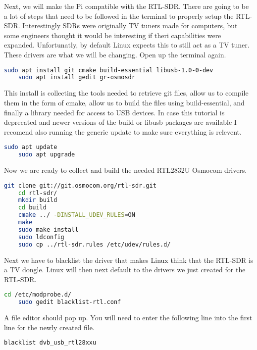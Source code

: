 \documentclass[letterpaper,12pt,notitlepage]{report} %
\begin{document}
Next, we will make the Pi compatible with the RTL-SDR. There are going to be a lot of steps that need to be followed in the terminal to properly setup the RTL-SDR. Interestingly SDRs were originally TV tuners made for computers, but some engineers thought it would be interesting if theri capabilities were expanded. Unfortunatly, by default Linux expects this to still act as a TV tuner. These drivers are what we will be changing. Open up the terminal again.

\begin{lstlisting}[language=bash]
	sudo apt install git cmake build-essential libusb-1.0-0-dev 
	sudo apt install gedit gr-osmosdr
\end{lstlisting}

This install is collecting the tools needed to retrieve git files, allow us to compile them in the form of cmake, allow us to build the files using build-essential, and finally a library needed for access to USB devices. In case this tutorial is deprecated and newer versions of the build or libusb packages are available I recomend also running the generic update to make sure everything is relevent.

\begin{lstlisting}[language=bash]
	sudo apt update
	sudo apt upgrade
\end{lstlisting}

Now we are ready to collect and build the needed RTL2832U Osmocom drivers.

\begin{lstlisting}[language=bash]
	git clone git://git.osmocom.org/rtl-sdr.git
	cd rtl-sdr/
	mkdir build
	cd build
	cmake ../ -DINSTALL_UDEV_RULES=ON
	make
	sudo make install
	sudo ldconfig
	sudo cp ../rtl-sdr.rules /etc/udev/rules.d/
\end{lstlisting}

Next we have to blacklist the driver that makes Linux think that the RTL-SDR is a TV dongle. Linux will then next default to the drivers we just created for the RTL-SDR.

\begin{lstlisting}[language=bash]
	cd /etc/modprobe.d/
	sudo gedit blacklist-rtl.conf
\end{lstlisting}

A file editor should pop up. You will need to enter the following line into the first line for the newly created file.

\begin{lstlisting}[language=bash]
	blacklist dvb_usb_rtl28xxu
\end{lstlisting}
\end{document}
